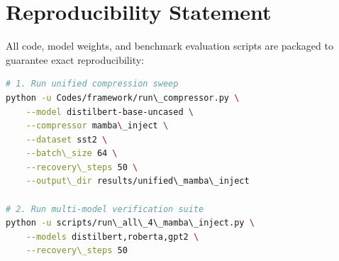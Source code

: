 \section{Reproducibility Statement}
All code, model weights, and benchmark evaluation scripts are packaged to guarantee exact reproducibility:
\begin{lstlisting}[language=bash]
# 1. Run unified compression sweep
python -u Codes/framework/run\_compressor.py \
    --model distilbert-base-uncased \
    --compressor mamba\_inject \
    --dataset sst2 \
    --batch\_size 64 \
    --recovery\_steps 50 \
    --output\_dir results/unified\_mamba\_inject

# 2. Run multi-model verification suite
python -u scripts/run\_all\_4\_mamba\_inject.py \
    --models distilbert,roberta,gpt2 \
    --recovery\_steps 50
\end{lstlisting}
